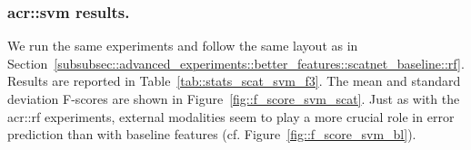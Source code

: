         \subsubsection{\texorpdfstring{\acrshort*{acr::svm}}{SVM} results.}
            \label{subsubsec::advanced_experiments::better_features::scatnet_baseline::svm}
            We run the same experiments and follow the same layout as in Section~\ref{subsubsec::advanced_experiments::better_features::scatnet_baseline::rf}.
            Results are reported in Table~\ref{tab::stats_scat_svm_f3}.
            The mean and standard deviation F-scores are shown in Figure~\ref{fig::f_score_svm_scat}.
            Just as with the \gls{acr::rf} experiments, external modalities seem to play a more crucial role in error prediction than with baseline features (cf. Figure~\ref{fig::f_score_svm_bl}).\\

